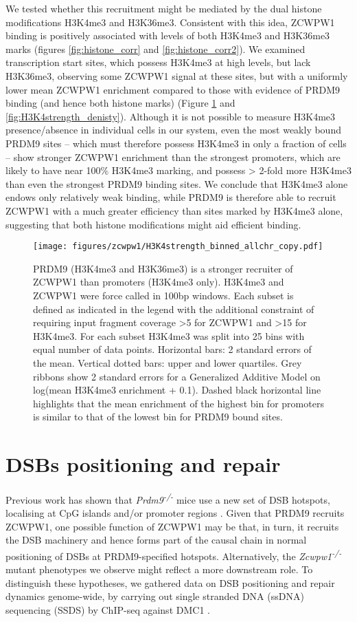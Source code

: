 We tested whether this recruitment might be mediated by the dual histone modifications H3K4me3 and H3K36me3. Consistent with this idea, ZCWPW1 binding is positively associated with levels of both H3K4me3 and H3K36me3 marks (figures \ref{fig:histone_corr} and \ref{fig:histone_corr2}). We examined transcription start sites, which possess H3K4me3 at high levels, but lack H3K36me3, observing some ZCWPW1 signal at these sites, but with a uniformly lower mean ZCWPW1 enrichment compared to those with evidence of PRDM9 binding (and hence both histone marks) (Figure \ref{fig:DualMark} and \ref{fig:H3K4strength_denisty}). Although it is not possible to measure H3K4me3 presence/absence in individual cells in our system, even the most weakly bound PRDM9 sites – which must therefore possess H3K4me3 in only a fraction of cells – show stronger ZCWPW1 enrichment than the strongest promoters, which are likely to have near 100\% H3K4me3 marking, and possess > 2-fold more H3K4me3 than even the strongest PRDM9 binding sites. We conclude that H3K4me3 alone endows only relatively weak binding, while PRDM9 is therefore able to recruit ZCWPW1 with a much greater efficiency than sites marked by H3K4me3 alone, suggesting that both histone modifications might aid efficient binding.

\begin{figure}[H]
	\centering
	\texttt{[image: figures/zcwpw1/H3K4strength\_binned\_allchr\_copy.pdf]}
	\caption[Dual mark recruitment]{
		PRDM9 (H3K4me3 and H3K36me3) is a stronger recruiter of ZCWPW1 than promoters (H3K4me3 only). H3K4me3 and ZCWPW1 were force called in 100bp windows. Each subset is defined as indicated in the legend with the additional constraint of requiring input fragment coverage >5 for ZCWPW1 and >15 for H3K4me3. For each subset H3K4me3 was split into 25 bins with equal number of data points. Horizontal bars: 2 standard errors of the mean. Vertical dotted bars: upper and lower quartiles. Grey ribbons show 2 standard errors for a Generalized Additive Model on log(mean H3K4me3 enrichment + 0.1). Dashed black horizontal line highlights that the mean enrichment of the highest bin for promoters is similar to that of the lowest bin for PRDM9 bound sites.
	}
	\label{fig:DualMark}
\end{figure}

\section{DSBs positioning and repair}
Previous work has shown that \textit{Prdm9\textsuperscript{-/-}} mice use a new set of DSB hotspots, localising at CpG islands and/or promoter regions \parencite{Brick2012Genetic}. Given that PRDM9 recruits ZCWPW1, one possible function of ZCWPW1 may be that, in turn, it recruits the DSB machinery and hence forms part of the causal chain in normal positioning of DSBs at PRDM9-specified hotspots. Alternatively, the \textit{Zcwpw1\textsuperscript{-/-}} mutant phenotypes we observe might reflect a more downstream role. To distinguish these hypotheses, we gathered data on DSB positioning and repair dynamics genome-wide, by carrying out single stranded DNA (ssDNA) sequencing (SSDS) by ChIP-seq against DMC1 \parencite{Khil2012Sensitive}.

